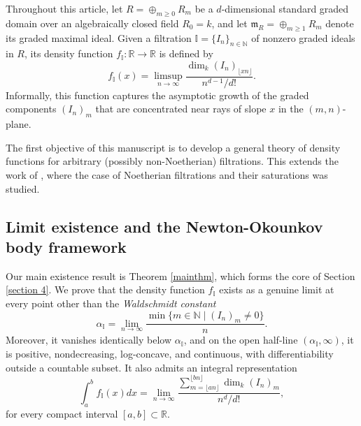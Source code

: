 \documentclass[12pt,a4paper]{amsart}
\theoremstyle{plain}
\theoremstyle{definition}
\numberwithin{equation}{theorem}
\newcommand{\mm}{\mathfrak{m}}
\begin{document}
Throughout this article, let $R=\oplus_{m\geq 0}R_m$ be a $d$-dimensional standard graded domain over an algebraically closed field $R_0=k$, and let $\mm_R = \oplus_{m\geq 1}R_m$ denote its graded maximal ideal. Given a filtration $\mathbb{I}=\{I_n\}_{n\in\mathbb N}$ of nonzero graded ideals in $R$, its density function $f_{\mathbb{I}} \colon \mathbb{R} \to \mathbb{R}$ is defined by
\[
f_{\mathbb{I}}(x) = \limsup_{n\to\infty} \dfrac{\dim_k {(I_n)}_{\lfloor xn\rfloor}}{n^{d-1}/d!}.
\]
Informally, this function captures the asymptotic growth of the graded components ${\left(I_n\right)}_m$ that are concentrated near rays of slope $x$ in the $(m,n)$-plane.

The first objective of this manuscript is to develop a general theory of density functions for arbitrary (possibly non-Noetherian) filtrations. This extends the work of \cite{DRT25}, where the case of Noetherian filtrations and their saturations was studied.

\subsection*{Limit existence and the Newton-Okounkov body framework}
Our main existence result is Theorem \ref{mainthm}, which forms the core of Section \ref{section 4}. We prove that the density function $f_{\mathbb{I}}$ exists as a genuine limit at every point other than the \emph{Waldschmidt constant} $$\alpha_{\mathbb{I}} = \lim_{n\to\infty}\frac{\min\{m\in\mathbb{N}\mid {(I_n)}_m\neq 0\}}{n}.$$ Moreover, it vanishes identically below $\alpha_{\mathbb{I}}$, and on the open half-line $(\alpha_{\mathbb{I}},\infty)$, it is positive, nondecreasing, log-concave, and continuous, with differentiability outside a countable subset. It also admits an integral representation $$\int_{a}^b f_{\mathbb{I}}(x)dx = \lim_{n\to\infty}\dfrac{\sum_{m=\lfloor an\rfloor}^{\lfloor bn\rfloor}\dim_k {\left(I_n\right)}_m}{n^d/d!},$$ for every compact interval $[a,b]\subset \mathbb{R}$.
\end{document}
